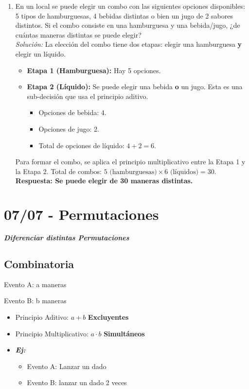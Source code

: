\documentclass[12pt, letterpaper]{article}
\begin{document}
\begin{enumerate}
	\item En un local se puede elegir un combo con las siguientes opciones disponibles: 5 tipos de hamburguesas, 4 bebidas distintas o bien un jugo de 2 sabores distintos. Si el combo consiste en una hamburguesa y una bebida/jugo, ¿de cuántas maneras distintas se puede elegir? \\
	      \textit{Solución:}
	      La elección del combo tiene dos etapas: elegir una hamburguesa \textbf{y} elegir un líquido.
	      \begin{itemize}
		      \item \textbf{Etapa 1 (Hamburguesa):} Hay 5 opciones.
		      \item \textbf{Etapa 2 (Líquido):} Se puede elegir una bebida \textbf{o} un jugo. Esta es una sub-decisión que usa el principio aditivo.
		            \begin{itemize}
			            \item Opciones de bebida: 4.
			            \item Opciones de jugo: 2.
			            \item Total de opciones de líquido: $4 + 2 = 6$.
		            \end{itemize}
	      \end{itemize}
	      Para formar el combo, se aplica el principio multiplicativo entre la Etapa 1 y la Etapa 2.
	      Total de combos: $5 \text{ (hamburguesas)} \times 6 \text{ (líquidos)} = 30$. \\
	      \textbf{Respuesta: Se puede elegir de 30 maneras distintas.}
\end{enumerate}
\newpage


\section{07/07 - Permutaciones}
\textbf{\textit{\large{Diferenciar distintas Permutaciones}}}

\subsection{Combinatoria}
Evento A: a maneras

Evento B: b maneras

\begin{itemize}
	\item Principio Aditivo: $a + b$ \textbf{Excluyentes}
	\item Principio Multiplicativo: $a \cdot b$ \textbf{Simultáneos}
	\item \textbf{\textit{Ej:}}
	      \begin{itemize}
		      \item Evento A: Lanzar un dado
		      \item Evento B: lanzar un dado 2 veces
	      \end{itemize}
\end{itemize}
\end{document}
